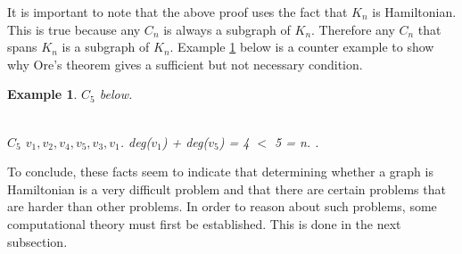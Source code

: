 \documentclass{article}
\newtheorem{example}[definition]{Example}
\begin{document}
It is important to note that the above proof uses the fact that $K_n$ is Hamiltonian. This is true because any $C_n$ is always a subgraph of $K_n$. Therefore any $C_n$ that spans $K_n$ is a subgraph of $K_n$. Example \ref{example 6} below is a counter example to show why Ore's theorem gives a sufficient but not necessary condition.\\
\begin{example}
\label{example 6}
{} $C_5$ below.
\\
\\
$C_5$ {} $v_1, v_2, v_4, v_5, v_3, v_1$. {} deg($v_1$) + deg($v_5$) = 4 $<$ 5 = n. {}.
\end{example} 
To conclude, these facts seem to indicate that determining whether a graph is Hamiltonian is a very difficult problem and that there are certain problems that are harder than other problems. In order to reason about such problems, some computational theory must first be established. This is done in the next subsection.
\end{document}
